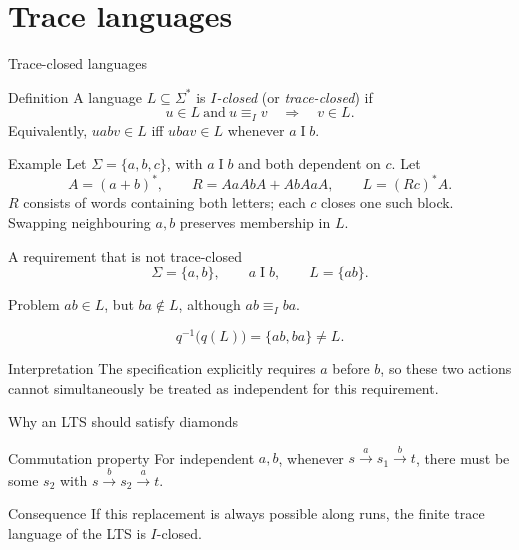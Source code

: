 \documentclass[t,11pt]{beamer}
\newcommand{\ind}{\mathrel{I}}
\begin{document}
\section{Trace languages}



\begin{frame}{Trace-closed languages}
  \begin{block}{Definition}
    A language $L\subseteq\Sigma^*$ is \emph{$I$-closed} (or \emph{trace-closed}) if
    \[
      u\in L\ \text{and}\ u\equiv_Iv
      \quad\Longrightarrow\quad v\in L.
    \]
    Equivalently, $uabv\in L$ iff $ubav\in L$ whenever $a\ind b$.
  \end{block}
  \begin{block}{Example}
    Let $\Sigma=\{a,b,c\}$, with $a\ind b$ and both dependent on $c$. Let
    \[
      A=(a+b)^*,\qquad R=AaAbA+AbAaA,\qquad L=(Rc)^*A.
    \]
    $R$ consists of words containing both letters; each $c$ closes one such block. Swapping neighbouring $a,b$ preserves membership in $L$.
  \end{block}
\end{frame}

\begin{frame}{A requirement that is not trace-closed}
  \[
     \Sigma=\{a,b\},\qquad a\ind b,\qquad L=\{ab\}.
  \]
  \begin{block}{Problem}
    $ab\in L$, but $ba\notin L$, although $ab\equiv_Iba$.
  \end{block}
  \[
    q^{-1}\bigl(q(L)\bigr)=\{ab,ba\}\neq L.
  \]
  \begin{block}{Interpretation}
    The specification explicitly requires $a$ before $b$, so these two actions cannot simultaneously be treated as independent for this requirement.
  \end{block}
\end{frame}

\begin{frame}{Why an LTS should satisfy diamonds}
  \begin{block}{Commutation property}
    For independent $a,b$, whenever
    $s\xrightarrow{a}s_1\xrightarrow{b}t$,
    there must be some $s_2$ with
    $s\xrightarrow{b}s_2\xrightarrow{a}t$.
  \end{block}
  \begin{center}
  \end{center}
  \begin{block}{Consequence}
    If this replacement is always possible along runs, the finite trace language of the LTS is $I$-closed.
  \end{block}
\end{frame}
\end{document}
